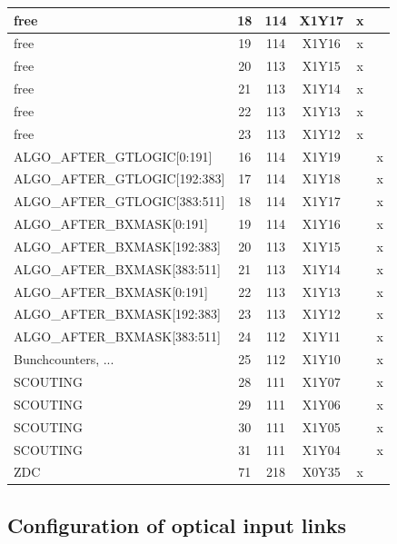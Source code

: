 \begin{longtable}{|l|c|c|c|c|c|}
free & 18  & 114 & X1Y17 & x &   \\\hline
free & 19  & 114 & X1Y16 & x &   \\\hline
free & 20  & 113 & X1Y15 & x &   \\\hline
free & 21  & 113 & X1Y14 & x &   \\\hline
free & 22  & 113 & X1Y13 & x &   \\\hline
free & 23  & 113 & X1Y12 & x &   \\\hline\hline
ALGO\_AFTER\_GTLOGIC[0:191] & 16  & 114 & X1Y19 &   & x \\\hline
ALGO\_AFTER\_GTLOGIC[192:383] & 17  & 114 & X1Y18 &   & x \\\hline
ALGO\_AFTER\_GTLOGIC[383:511] & 18  & 114 & X1Y17 &   & x \\\hline
ALGO\_AFTER\_BXMASK[0:191] & 19  & 114 & X1Y16 &   & x \\\hline
ALGO\_AFTER\_BXMASK[192:383] & 20  & 113 & X1Y15 &   & x \\\hline
ALGO\_AFTER\_BXMASK[383:511] & 21  & 113 & X1Y14 &   & x \\\hline
ALGO\_AFTER\_BXMASK[0:191] & 22  & 113 & X1Y13 &   & x \\\hline
ALGO\_AFTER\_BXMASK[192:383] & 23  & 113 & X1Y12 &   & x \\\hline
ALGO\_AFTER\_BXMASK[383:511] & 24  & 112 & X1Y11 &   & x \\\hline
Bunchcounters, ... & 25  & 112 & X1Y10 &   & x \\\hline
SCOUTING & 28  & 111 & X1Y07 &   & x \\\hline
SCOUTING & 29  & 111 & X1Y06 &   & x \\\hline
SCOUTING & 30  & 111 & X1Y05 &   & x \\\hline
SCOUTING & 31  & 111 & X1Y04 &   & x \\\hline\hline
ZDC & 71  & 218 & X0Y35 & x & \\\hline
\end{longtable}

\clearpage

\subsection{Configuration of optical input links}\label{sec:app:app_b}

% 
% 

